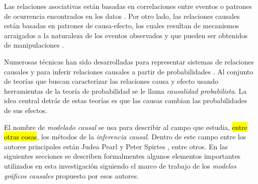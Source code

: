 



Las relaciones asociativas están basadas en correlaciones
entre eventos o patrones de ocurrencia encontrados en los
datos \cite{pearl2018bookofwhy}. Por otro lado, las relaciones
causales están basadas en patrones de causa-efecto,
los cuales resultan de mecanismos arraigados a la naturaleza
de los eventos observados y que pueden ser obtenidos de 
manipulaciones \cite{sep-causal-models}.

Numerosas técnicas han sido desarrolladas para representar
sistemas de relaciones causales y para inferir 
relaciones causales a partir de probabilidades \cite{sep-causation-probabilistic}.
Al conjunto de teorías que buscan caracterizar las
relaciones causa y efecto usando herramientas de la
teoría de probabilidad se le llama \textit{causalidad probabilista}. 
La idea central detrás de estas teorías es que las causas cambian las probabilidades de sus efectos.

El nombre de \textit{modelado causal} se usa para describir al campo 
que estudia, \hl{entre otras cosas}, los métodos de la \textit{inferencia causal}. Dentro de este campo
entre los autores principales están
Judea Pearl \cite{pearl2010introduction} y Peter Spirtes \cite{spirtes2000causation}, entre otros. En las siguientes secciones
se describen formalmentes algunos elementos importantes utilizados en esta investigación
siguiendo el marco de trabajo de los \textit{modelos gráficos causales} propuesto por esos autores.


